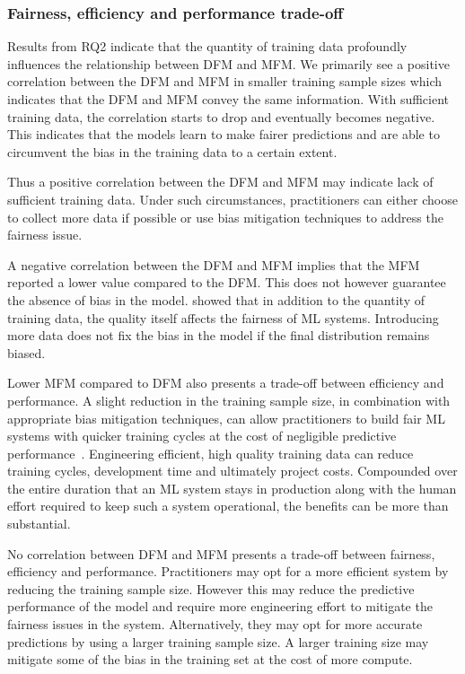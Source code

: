 \documentclass[sigconf,review,anonymous]{acmart}
\begin{document}
\subsubsection{Fairness, efficiency and performance trade-off}\label{sec:discuss-fair-eff-perf-trade}

Results from RQ2 indicate that the quantity of training data
profoundly influences the relationship between DFM and MFM. We
primarily see a positive correlation between the DFM and MFM in
smaller training sample sizes which indicates that the DFM and MFM
convey the same information. With sufficient training data, the
correlation starts to drop and eventually becomes negative. This
indicates that the models learn to make fairer predictions and are
able to circumvent the bias in the training data to a certain extent.

Thus a positive correlation between the DFM and MFM may indicate lack
of sufficient training data. Under such circumstances, practitioners
can either choose to collect more data if possible or use bias
mitigation techniques to address the fairness issue.

A negative correlation between the DFM and MFM implies that the MFM
reported a lower value compared to the DFM. This does not however
guarantee the absence of bias in the
model. \citet{zhang2021ignorance} showed that in addition to the
quantity of training data, the quality itself affects the fairness of
ML systems. Introducing more data does not fix the bias in the model
if the final distribution remains biased.

Lower MFM compared to DFM also presents a trade-off between efficiency
and performance. A slight reduction in the training sample size, in
combination with appropriate bias mitigation techniques, can allow
practitioners to build fair ML systems with quicker training cycles at
the cost of negligible predictive
performance \cite{verdecchia2022data}. Engineering efficient, high
quality training data can reduce training cycles, development time and
ultimately project costs. Compounded over the entire duration that an
ML system stays in production along with the human effort required to
keep such a system operational, the benefits can be more than
substantial.

No correlation between DFM and MFM presents a trade-off between
fairness, efficiency and performance. Practitioners may opt for a more
efficient system by reducing the training sample size. However this
may reduce the predictive performance of the model and require more
engineering effort to mitigate the fairness issues in the system.
Alternatively, they may opt for more accurate predictions by using a
larger training sample size. A larger training size may mitigate some
of the bias in the training set at the cost of more compute.
\end{document}
